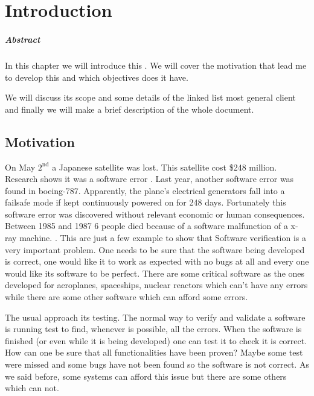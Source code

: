 \chapter{Introduction\label{chap:introduction}}

\paragraph{Abstract}

In this chapter we will introduce this \thisworkm. We will cover the motivation that lead me to develop this \thisworkm and which objectives does it have.

We will discuss its scope and some details of the linked list most general client and finally we will make a brief description of the whole document. 

\section{Motivation}

\label{Motivation}
On May $\text{2}^{\text{nd}}$ a Japanese satellite was lost. This satellite cost \$248 million.
%
Research shows it was a software error \cite{japaneseSatellite}. 
%
Last year, another software error was found in boeing-787.
%
Apparently, the plane’s electrical generators fall into a failsafe mode if kept continuously powered on for 248 days. \cite{boein787}
%
Fortunately this software error was discovered without relevant economic or human consequences.
%
Between 1985 and 1987 6 people died because of a software malfunction of a x-ray machine. \cite{xraykill}.
%
This are just a few example to show that Software verification is a very important problem.
%
One needs to be sure that the software being developed is correct, one would like it to work as expected with no bugs at all and every one would like its software to be perfect.
%
There are some critical software as the ones developed for aeroplanes, spaceships, nuclear reactors which can't have any errors while there are some other software which can afford some errors.


The usual approach its testing.
% 
The normal way to verify and validate a software is running test to find, whenever is possible, all the errors.
% 
When the software is finished (or even while it is being developed) one can test it to check it is correct.
%
How can one be sure that all functionalities have been proven? Maybe some test were missed and some bugs have not been found so the software is not correct.
%
As we said before, some systems can afford this issue but there are some others which can not.


